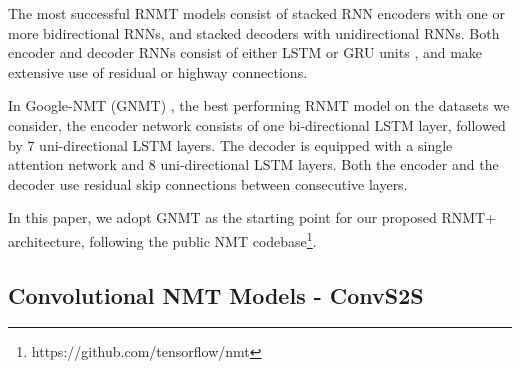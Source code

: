 \documentclass[11pt,a4paper]{article}
\begin{document}
The most successful RNMT models consist of stacked RNN encoders with one or
more bidirectional RNNs, and stacked decoders with unidirectional RNNs. Both
encoder and decoder RNNs consist of either LSTM \cite{hochreiter1997long} or
GRU units \cite{ChoMGBSB14}, and make extensive use of residual
\cite{DBLP:journals/corr/HeZRS15} or highway
\cite{DBLP:journals/corr/SrivastavaGS15} connections.

In Google-NMT (GNMT) \cite{DBLP:journals/corr/WuSCLNMKCGMKSJL16},
the best performing RNMT model on the datasets we consider,
the encoder network consists of one bi-directional LSTM layer, followed by 7
uni-directional LSTM layers. The decoder is equipped with a single attention
network and 8 uni-directional LSTM layers.
Both the encoder and the decoder use residual skip connections between
consecutive layers.

In this paper, we adopt GNMT as the starting point for our proposed RNMT+ architecture,
following the public NMT codebase\footnote{https://github.com/tensorflow/nmt}.




\subsection{Convolutional NMT Models - ConvS2S}
\end{document}
